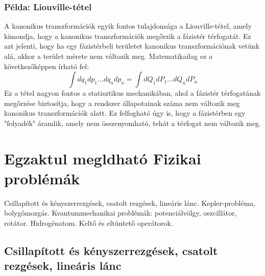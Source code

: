 \documentclass[a4paper,12pt]{article}
\begin{document}
\subsubsection*{Példa: Liouville-tétel}
A kanonikus transzformációk egyik fontos tulajdonsága a Liouville-tétel, amely kimondja, hogy a kanonikus transzformációk megőrzik a fázistér térfogatát. Ez azt jelenti, hogy ha egy fázistérbeli területet kanonikus transzformációnak vetünk alá,
akkor a terület mérete nem változik meg. Matematikailag ez a következőképpen írható fel:
\begin{equation}
    \int dq_1 dp_1 \ldots dq_n dp_n = \int dQ_1 dP_1 \ldots dQ_n dP_n
\end{equation}
Ez a tétel nagyon fontos a statisztikus mechanikában, ahol a fázistér térfogatának megőrzése biztosítja, hogy a rendszer állapotainak száma nem változik meg kanonikus transzformációk alatt. Ez felfogható úgy is,
hogy a fázistérben egy "folyadék" áramlik, amely nem összenyomható, tehát a térfogat nem változik meg.

\newpage
\section{Egzaktul megldható Fizikai problémák}
Csillapított és kényszerrezgések, csatolt rezgések, lineáris lánc. Kepler-probléma, bolygómozgás. Kvantummechanikai problémák: potenciálvölgy, oszcillátor, rotátor. Hidrogénatom. Keltő és eltüntető operátorok.

\subsection{Csillapított és kényszerrezgések, csatolt rezgések, lineáris lánc}
\end{document}

